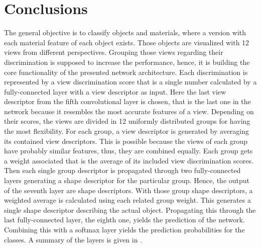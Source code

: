 \section{Conclusions}
\label{sec:discussion-conclusion}
The general objective is to classify objects and materials, where a version with each material feature of each object exists.
Those objects are visualized with 12 views from different perspectives.
Grouping those views regarding their discrimination is supposed to increase the performance, hence, it is building the core functionality of the presented network architecture.
Each discrimination is represented by a view discrimination score that is a single number calculated by a fully-connected layer with a view descriptor as input.
Here the last view descriptor from the fifth convolutional layer is chosen, that is the last one in the network because it resembles the most accurate features of a view.
Depending on their scores, the views are divided in 12 uniformly distributed groups for having the most flexibility.
For each group, a view descriptor is generated by averaging its contained view descriptors.
This is possible because the views of each group have probably similar features, thus, they are combined equally.
Each group gets a weight associated that is the average of its included view discrimination scores.
Then each single group descriptor is propagated through two fully-connected layers generating a shape descriptor for the particular group.
Hence, the output of the seventh layer are shape descriptors.
With those group shape descriptors, a weighted average is calculated using each related group weight.
This generates a single shape descriptor describing the actual object.
Propagating this through the last fully-connected layer, the eighth one, yields the prediction of the network.
Combining this with a softmax layer yields the prediction probabilities for the classes.
A summary of the layers is given in .

